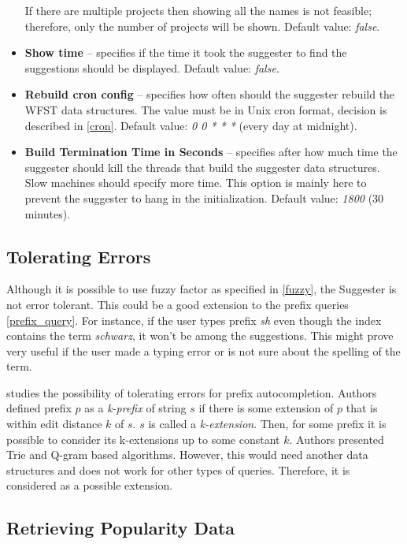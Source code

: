\begin{itemize}
    If there are multiple projects then showing all the names is not feasible; therefore, only the number of projects will be shown.
    Default value: \textit{false}.
    \item \textbf{Show time} – specifies if the time it took the suggester to find the suggestions should be displayed.
    Default value: \textit{false}.
    \item \textbf{Rebuild cron config} – specifies how often should the suggester rebuild the WFST data structures.
    The value must be in Unix cron format, decision is described in \ref{cron}.  Default value: \textit{0 0 * * *} (every day at midnight).
    \item \textbf{Build Termination Time in Seconds} – specifies after how much time the suggester should kill the
    threads that build the suggester data structures. Slow machines should specify more time. This option is mainly here
    to prevent the suggester to hang in the initialization. Default value: \textit{1800} (30 minutes).
\end{itemize}

\subsection{Tolerating Errors}
Although it is possible to use fuzzy factor as specified in \ref{fuzzy}, the Suggester is not error tolerant.
This could be a good extension to the prefix queries \ref{prefix_query}.
For instance, if the user types prefix \textit{sh} even though
the index contains the term \textit{schwarz}, it won't be among the suggestions. This might prove very useful if the
user made a typing error or is not sure about the spelling of the term.

\citep{Chaudhuri09extendingautocompletion} studies the possibility of tolerating errors for prefix autocompletion.
Authors defined prefix $p$ as a \textit{k-prefix} of string $s$ if there is some extension of $p$ that is within edit
distance $k$ of $s$. $s$ is called a \textit{k-extension}. Then, for some prefix it is possible to consider its
k-extensions up to some constant $k$. Authors presented Trie and Q-gram based algorithms. However, this would need
another data structures and does not work for other types of queries. Therefore, it is considered as a possible extension.

\subsection{Retrieving Popularity Data}
\label{retrieving_popularity_data}

